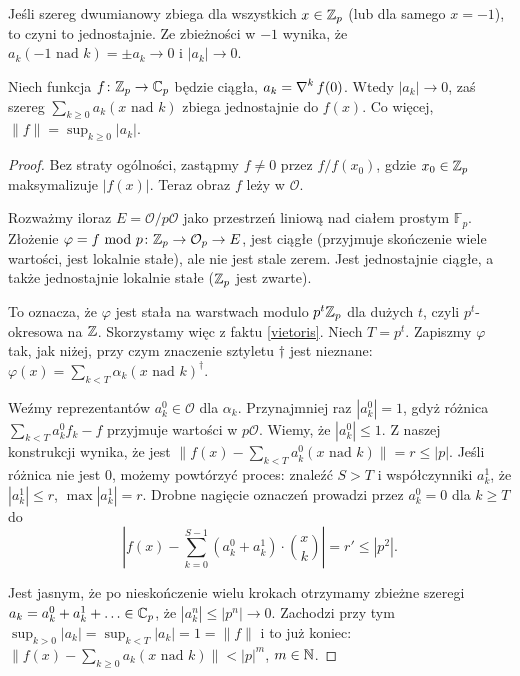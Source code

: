 Jeśli szereg dwumianowy zbiega dla wszystkich $x \in \mathbb Z_p$ (lub dla samego $x = -1$), to czyni to jednostajnie.
Ze zbieżności w $-1$ wynika, że $a_k (-1 \mbox{ nad } k) = \pm a_k \to 0$ i $|a_k| \to 0$.

\begin{twierdzenie}[Mahler]
	Niech funkcja $f \colon \mathbb Z_p \to \mathbb C_p$ będzie ciągła, $a_k = \operatorname{\nabla}^k f(0)$.
	Wtedy $|a_k| \to 0$, zaś szereg $\sum_{k \ge 0} a_k (x \mbox{ nad } k)$ zbiega jednostajnie do $f(x)$.
	Co więcej, $\|f\| = \sup_{k \ge 0} |a_k|$.
\end{twierdzenie}

\begin{proof}
	Bez straty ogólności, zastąpmy $f \neq 0$ przez $f / f(x_0)$, gdzie $x_0 \in \mathbb Z_p$ maksymalizuje $|f(x)|$.
	Teraz obraz $f$ leży w $\mathcal O$.

	Rozważmy iloraz $E = \mathcal O / p \mathcal O$ jako przestrzeń liniową nad ciałem prostym $\mathbb F_p$.
	Złożenie $\varphi = f \mbox{ mod } p \colon \mathbb Z_p \to \mathcal O_p \to E$, jest ciągłe (przyjmuje skończenie wiele wartości, jest lokalnie stałe), ale nie jest stale zerem.
	Jest jednostajnie ciągłe, a także jednostajnie lokalnie stałe ($\mathbb Z_p$ jest zwarte).

	To oznacza, że $\varphi$ jest stała na warstwach modulo $p^t\mathbb Z_p$ dla dużych $t$, czyli $p^t$-okresowa na $\mathbb Z$.
	Skorzystamy więc z faktu \ref{vietoris}.
	Niech $T = p^t$.
	Zapiszmy $\varphi$ tak, jak niżej, przy czym znaczenie sztyletu $\dagger$ jest nieznane: $\varphi(x) = \sum_{k < T} \alpha_k (x \mbox{ nad } k)^\dagger$.

	Weźmy reprezentantów $a_k^0 \in \mathcal O$ dla $\alpha_k$.
	Przynajmniej raz $|a_k^0| = 1$, gdyż różnica $\sum_{k < T} a_k^0 f_k - f$ przyjmuje wartości w $p \mathcal O$.
	Wiemy, że $|a_k^0| \le 1$.
	Z naszej konstrukcji wynika, że jest $\|f(x) - \sum_{k < T} a_k^0 (x \mbox{ nad } k)\| = r \le |p|$.
	Jeśli różnica nie jest $0$, możemy powtórzyć proces: znaleźć $S > T$ i współczynniki $a_k^1$, że $|a_k^1| \le r$, $\max |a_k^1| = r$.
	Drobne nagięcie oznaczeń prowadzi przez $a_k^0 = 0$ dla $k \ge T$ do
	\[
		\left|f(x) - \sum_{k=0}^{S-1} (a_k^0 + a_k^1) \cdot {x \choose k} \right| = r' \le |p^2|.
	\]

	Jest jasnym, że po nieskończenie wielu krokach otrzymamy zbieżne szeregi $a_k = a_k^0 + a_k^1 + \ldots \in \mathbb C_p$, że $|a_k^n| \le |p^n| \to 0$.
	Zachodzi przy tym $\sup_{k > 0} |a_k| = \sup_{k<T} |a_k| = 1 = \|f\|$ i to już koniec: $\|f(x) - \sum_{k \ge 0} a_k (x \mbox { nad } k) \| < |p|^m$, $m \in \mathbb N$.
\end{proof}

